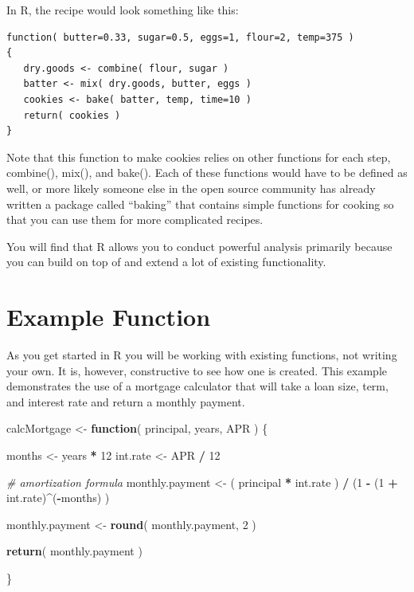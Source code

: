 \documentclass[]{book}
\newenvironment{Shaded}{\begin{snugshade}}{\end{snugshade}}
\newcommand{\CommentTok}[1]{\textcolor[rgb]{0.56,0.35,0.01}{\textit{#1}}}
\newcommand{\ControlFlowTok}[1]{\textcolor[rgb]{0.13,0.29,0.53}{\textbf{#1}}}
\newcommand{\DecValTok}[1]{\textcolor[rgb]{0.00,0.00,0.81}{#1}}
\newcommand{\KeywordTok}[1]{\textcolor[rgb]{0.13,0.29,0.53}{\textbf{#1}}}
\newcommand{\NormalTok}[1]{#1}
\newcommand{\OperatorTok}[1]{\textcolor[rgb]{0.81,0.36,0.00}{\textbf{#1}}}
\newcommand{\StringTok}[1]{\textcolor[rgb]{0.31,0.60,0.02}{#1}}
\theoremstyle{definition}
\theoremstyle{definition}
\theoremstyle{definition}
\theoremstyle{remark}
\begin{document}
In R, the recipe would look something like this:

\begin{verbatim}
function( butter=0.33, sugar=0.5, eggs=1, flour=2, temp=375 )
{
   dry.goods <- combine( flour, sugar )
   batter <- mix( dry.goods, butter, eggs )
   cookies <- bake( batter, temp, time=10 )
   return( cookies )
}
\end{verbatim}

Note that this function to make cookies relies on other functions for
each step, combine(), mix(), and bake(). Each of these functions would
have to be defined as well, or more likely someone else in the open
source community has already written a package called ``baking'' that
contains simple functions for cooking so that you can use them for more
complicated recipes.

You will find that R allows you to conduct powerful analysis primarily
because you can build on top of and extend a lot of existing
functionality.

\hypertarget{example-function}{%
\section{Example Function}\label{example-function}}

As you get started in R you will be working with existing functions, not
writing your own. It is, however, constructive to see how one is
created. This example demonstrates the use of a mortgage calculator that
will take a loan size, term, and interest rate and return a monthly
payment.

\begin{Shaded}
\begin{Highlighting}[]
\NormalTok{   calcMortgage <-}\StringTok{ }\ControlFlowTok{function}\NormalTok{( principal, years, APR )}
\NormalTok{   \{}

\NormalTok{      months <-}\StringTok{ }\NormalTok{years }\OperatorTok{*}\StringTok{ }\DecValTok{12}
\NormalTok{      int.rate <-}\StringTok{ }\NormalTok{APR }\OperatorTok{/}\StringTok{ }\DecValTok{12}
      
      \CommentTok{# amortization formula}
\NormalTok{      monthly.payment <-}\StringTok{ }\NormalTok{( principal }\OperatorTok{*}\StringTok{ }\NormalTok{int.rate ) }\OperatorTok{/}\StringTok{ }
\StringTok{                         }\NormalTok{(}\DecValTok{1} \OperatorTok{-}\StringTok{ }\NormalTok{(}\DecValTok{1} \OperatorTok{+}\StringTok{ }\NormalTok{int.rate)}\OperatorTok{^}\NormalTok{(}\OperatorTok{-}\NormalTok{months) )}
      
\NormalTok{      monthly.payment <-}\StringTok{ }\KeywordTok{round}\NormalTok{( monthly.payment, }\DecValTok{2}\NormalTok{ )}
      
      \KeywordTok{return}\NormalTok{( monthly.payment )}
   
\NormalTok{   \}}
\end{Highlighting}
\end{Shaded}
\end{document}
